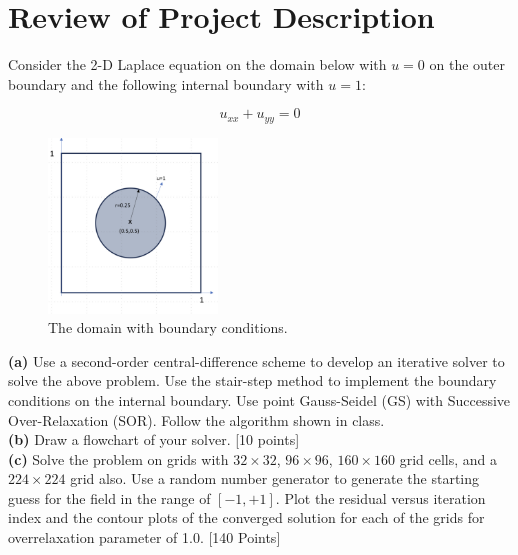 \documentclass[12pt]{article}
\begin{document}
\tableofcontents





\thispagestyle{fancy} %

\section{Review of Project Description}
Consider the 2-D Laplace equation on the domain below with \( u=0 \) on 
the outer boundary and the following internal boundary with \( u=1 \):

\begin{equation}
    u_{xx} + u_{yy} = 0 \label{eq:laplace}
\end{equation}

\begin{figure}[ht!]
    \centering
    \includegraphics[width=0.4\textwidth]{Problem01.jpg}
    \caption{The domain with boundary conditions.}
\end{figure}

\noindent\textbf{(a)} Use a second-order central-difference scheme to develop an 
iterative solver to solve the above problem. Use the stair-step method to implement 
the boundary conditions on the internal boundary. Use point Gauss-Seidel (GS) with 
Successive Over-Relaxation (SOR). Follow the algorithm shown in class.\\

\textbf{(b)} Draw a flowchart of your solver. [10 points]\\

\textbf{(c)} Solve the problem on grids with \( 32 \times 32 \), 
\( 96 \times 96 \), \( 160 \times 160 \) grid cells, and a 
\( 224 \times 224 \) grid also. Use a random number generator to generate 
the starting guess for the field in the range of \( [-1, +1] \). Plot the 
residual versus iteration index and the contour plots of the converged solution 
for each of the grids for overrelaxation parameter of 1.0. [140 Points]\\
\end{document}
